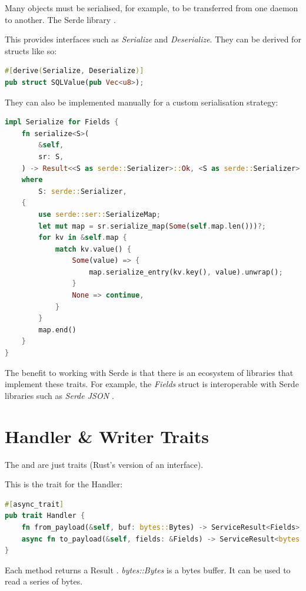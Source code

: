 \documentclass[a4paper,12pt]{report}
\begin{document}
Many objects must be serialised, for example, to be transferred from one daemon to another.
The Serde library \cite{serde}.

This provides interfaces such as \textit{Serialize} and \textit{Deserialize}. They can be derived \cite{derive} for structs like so:

\begin{lstlisting}[language=Rust]
#[derive(Serialize, Deserialize)]
pub struct SQLValue(pub Vec<u8>);
\end{lstlisting}

They can also be implemented manually for a custom serialisation strategy:

\begin{lstlisting}[language=Rust]
impl Serialize for Fields {
    fn serialize<S>(
        &self,
        sr: S,
    ) -> Result<<S as serde::Serializer>::Ok, <S as serde::Serializer>::Error>
    where
        S: serde::Serializer,
    {
        use serde::ser::SerializeMap;
        let mut map = sr.serialize_map(Some(self.map.len()))?;
        for kv in &self.map {
            match kv.value() {
                Some(value) => {
                    map.serialize_entry(kv.key(), value).unwrap();
                }
                None => continue,
            }
        }
        map.end()
    }
}
\end{lstlisting}

The benefit to working with Serde is that there is an ecosystem of libraries that implement these traits.
For example, the \textit{Fields} struct is interoperable with Serde libraries such as \textit{Serde JSON \cite{serde_json}}.

\section{Handler \& Writer Traits}

The  and  are just traits \cite{trait} (Rust's version of an interface).

This is the trait for the Handler:
\begin{lstlisting}[language=Rust]
#[async_trait]
pub trait Handler {
    fn from_payload(&self, buf: bytes::Bytes) -> ServiceResult<Fields>;
    async fn to_payload(&self, fields: &Fields) -> ServiceResult<bytes::Bytes>;
}
\end{lstlisting}

Each method returns a Result \cite{result}.
\textit{bytes::Bytes} is a bytes buffer. It can be used to read a series of bytes.
\end{document}
